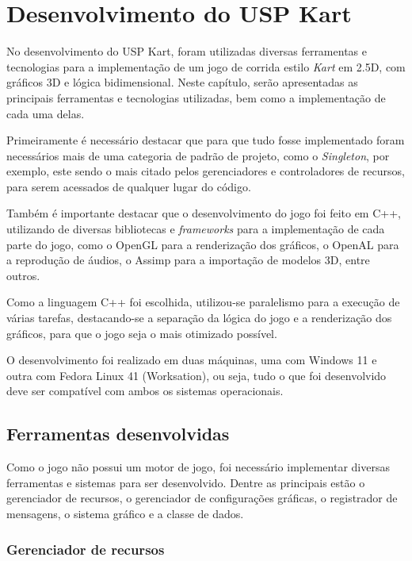\chapter{Desenvolvimento do USP Kart}

No desenvolvimento do USP Kart, foram utilizadas diversas ferramentas e tecnologias para a implementação de um jogo de corrida estilo \textit{Kart} em 2.5D, com gráficos 3D e lógica bidimensional. Neste capítulo, serão apresentadas as principais ferramentas e tecnologias utilizadas, bem como a implementação de cada uma delas.

Primeiramente é necessário destacar que para que tudo fosse implementado foram necessários mais de uma categoria de padrão de projeto, como o \textit{Singleton}, por exemplo, este sendo o mais citado pelos gerenciadores e controladores de recursos, para serem acessados de qualquer lugar do código.

Também é importante destacar que o desenvolvimento do jogo foi feito em C++, utilizando de diversas bibliotecas e \textit{frameworks} para a implementação de cada parte do jogo, como o OpenGL para a renderização dos gráficos, o OpenAL para a reprodução de áudios, o Assimp para a importação de modelos 3D, entre outros.

Como a linguagem C++ foi escolhida, utilizou-se paralelismo para a execução de várias tarefas, destacando-se a separação da lógica do jogo e a renderização dos gráficos, para que o jogo seja o mais otimizado possível.

O desenvolvimento foi realizado em duas máquinas, uma com Windows 11 e outra com Fedora Linux 41 (Worksation), ou seja, tudo o que foi desenvolvido deve ser compatível com ambos os sistemas operacionais.

\section{Ferramentas desenvolvidas}

Como o jogo não possui um motor de jogo, foi necessário implementar diversas ferramentas e sistemas para ser desenvolvido. Dentre as principais estão o gerenciador de recursos, o gerenciador de configurações gráficas, o registrador de mensagens, o sistema gráfico e a classe de dados.

\subsection{Gerenciador de recursos}

